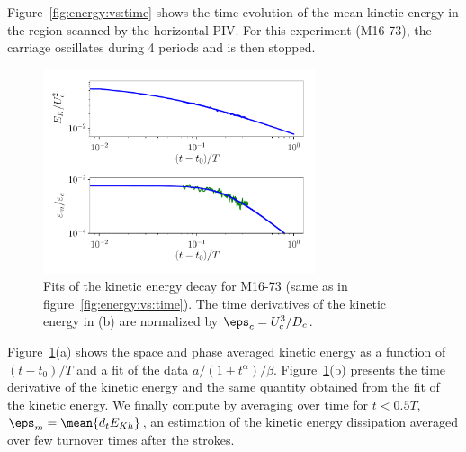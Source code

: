 Figure~\ref{fig:energy:vs:time} shows the time evolution of the mean kinetic
energy in the region scanned by the horizontal PIV. For this experiment
(M16-73), the carriage oscillates during 4 periods and is then stopped.

\begin{figure}[htp!]
\centering
\includegraphics[width=80mm]{tmp/fig_fit_EK}

\caption{Fits of the kinetic energy decay for M16-73 (same as in
figure~\ref{fig:energy:vs:time}). The time derivatives of the kinetic energy in
(b) are normalized by $\eps_c = U_c^3 / D_c$.}%
\label{fig:fit:EK}

\end{figure}

Figure~\ref{fig:fit:EK}(a) shows the space and phase averaged kinetic energy as
a function of $(t - t_0)/T$ and a fit of the data $a / (1 + t^\alpha)/\beta$.
Figure~\ref{fig:fit:EK}(b) presents the time derivative of the kinetic energy
and the same quantity obtained from the fit of the kinetic energy. We finally
compute by averaging over time for $t < 0.5 T$, $\eps_m= \mean{d_t E_{Kh}}$, an
estimation of the kinetic energy dissipation averaged over few turnover times
after the strokes.

